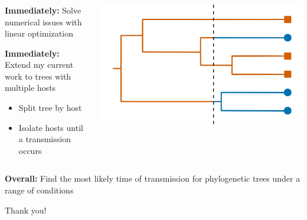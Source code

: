 \documentclass[aspectratio=169]{beamer}
\begin{document}
\begin{frame} \frametitle{\insertsection}
    
    \begin{columns}

        \begin{column}{0.5\textwidth}

            \textbf{Immediately:} Solve numerical issues with linear optimization 

            \textbf{Immediately:} Extend my current work to trees with multiple hosts

            \begin{itemize}
                \item{Split tree by host}
                \item{Isolate hosts until a transmission occurs}
            \end{itemize}
            
        \end{column}

        \begin{column}{0.5\textwidth}

            \centering\includegraphics[width=\textwidth]{images/tree-option1}

        \end{column}

    \end{columns}
    
    \vfill

    \textbf{Overall:} Find the most likely time of transmission for phylogenetic
    trees under a range of conditions 

\end{frame}

\begin{frame}

    \begin{center}

        \begin{Huge}

            Thank you!

        \end{Huge}


    \end{center}

\end{frame}
\end{document}
